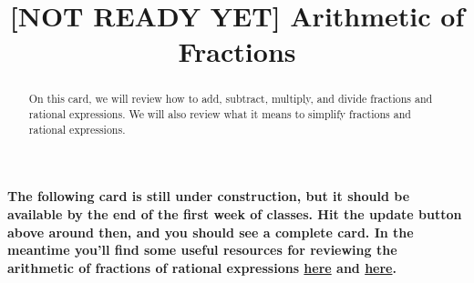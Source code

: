 \documentclass{ximera}
\title[Dig-In:]{[NOT READY YET] Arithmetic of Fractions}
\begin{document}
\begin{abstract}
On this card, we will review how to add, subtract, multiply, and divide fractions and rational expressions.  We will also review what it means to simplify fractions and rational expressions.
\end{abstract}
\maketitle

\textbf{The following card is still under construction, but it should be available by the end of the first week of classes.  Hit the update button above around then, and you should see a complete card.  In the meantime you'll find some useful resources for reviewing the arithmetic of fractions of rational expressions \href{https://www.khanacademy.org/math/arithmetic/fraction-arithmetic}{here} and \href{https://www.khanacademy.org/math/algebra2/rational-expressions-equations-and-functions}{here}.}
\end{document}
